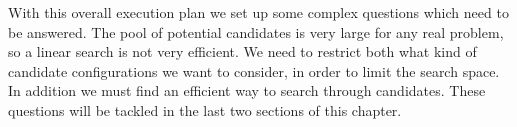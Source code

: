 With this overall execution plan we set up some complex questions which need to be answered. The pool of potential candidates is very large for any real problem, so a linear search is not very efficient. We need to restrict both what kind of candidate configurations we want to consider, in order to limit the search space. In addition we must find an efficient way to search through candidates. These questions will be tackled in the last two sections of this chapter. 

 



